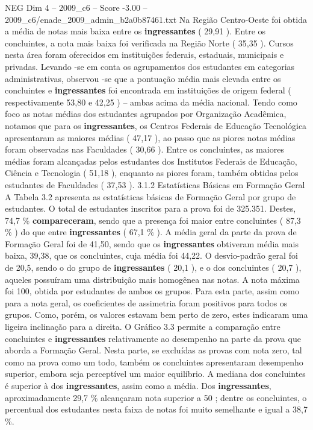 \begin{textsample}{NEG Dim 4 – 2009\_c6 – Score -3.00 – 2009\_c6/enade\_2009\_admin\_b2a0b87461.txt}
Na Região Centro-Oeste foi obtida a média de notas mais baixa entre os \textbf{ingressantes} ( 29,91 ).
Entre os concluintes, a nota mais baixa foi verificada na Região Norte ( 35,35 ).
Cursos nesta área foram oferecidos em instituições federais, estaduais, municipais e privadas.
Levando -se em conta os agrupamentos dos estudantes em categorias administrativas, observou -se que a pontuação média mais elevada entre os concluintes e \textbf{ingressantes} foi encontrada em instituições de origem federal ( respectivamente 53,80 e 42,25 ) – ambas acima da média nacional.
Tendo como foco as notas médias dos estudantes agrupados por Organização Acadêmica, notamos que para os \textbf{ingressantes}, os Centros Federais de Educação Tecnológica apresentaram as maiores médias ( 47,17 ), ao passo que as piores notas médias foram observadas nas Faculdades ( 30,66 ).
Entre os concluintes, as maiores médias foram alcançadas pelos estudantes dos Institutos Federais de Educação, Ciência e Tecnologia ( 51,18 ), enquanto as piores foram, também obtidas pelos estudantes de Faculdades ( 37,53 ). 3.1.2 Estatísticas Básicas em Formação Geral A Tabela 3.2 apresenta as estatísticas básicas de Formação Geral por grupo de estudantes.
O total de estudantes inscritos para a prova foi de 325.351.
Destes, 74,7 \% \textbf{compareceram}, sendo que a presença foi maior entre concluintes ( 87,3 \% ) do que entre \textbf{ingressantes} ( 67,1 \% ).
A média geral da parte da prova de Formação Geral foi de 41,50, sendo que os \textbf{ingressantes} obtiveram média mais baixa, 39,38, que os concluintes, cuja média foi 44,22.
O desvio-padrão geral foi de 20,5, sendo o do grupo de \textbf{ingressantes} ( 20,1 ), e o dos concluintes ( 20,7 ), aqueles possuíram uma distribuição mais homogênea nas notas.
A nota máxima foi 100, obtida por estudantes de ambos os grupos.
Para esta parte, assim como para a nota geral, os coeficientes de assimetria foram positivos para todos os grupos.
Como, porém, os valores estavam bem perto de zero, estes indicaram uma ligeira inclinação para a direita.
O Gráfico 3.3 permite a comparação entre concluintes e \textbf{ingressantes} relativamente ao desempenho na parte da prova que aborda a Formação Geral.
Nesta parte, se excluídas as provas com nota zero, tal como na prova como um todo, também os concluintes apresentaram desempenho superior, embora seja perceptível um maior equilíbrio.
A mediana dos concluintes é superior à dos \textbf{ingressantes}, assim como a média.
Dos \textbf{ingressantes}, aproximadamente 29,7 \% alcançaram nota superior a 50 ; dentre os concluintes, o percentual dos estudantes nesta faixa de notas foi muito semelhante e igual a 38,7 \%.

\end{textsample}
